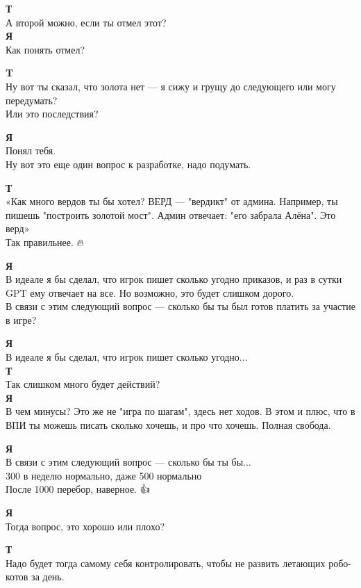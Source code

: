 \textbf{Т}\\
А второй можно, если ты отмел этот?\\

\textbf{Я}\\
Как понять отмел?

\textbf{T}\\
Ну вот ты сказал, что золота нет — я сижу и грущу до следующего или могу передумать?\\
Или это последствия?

\textbf{Я}\\
Понял тебя.\\
Ну вот это еще один вопрос к разработке, надо подумать.

\textbf{Т}\\
«Как много вердов ты бы хотел? ВЕРД — "вердикт" от админа. Например, ты пишешь "построить золотой мост". Админ отвечает: "его забрала Алёна". Это верд»\\
Так правильнее. 🔥🦔

\textbf{Я}\\
В идеале я бы сделал, что игрок пишет сколько угодно приказов, и раз в сутки GPT ему отвечает на все. Но возможно, это будет слишком дорого.\\
В связи с этим следующий вопрос — сколько бы ты был готов платить за участие в игре?

\textbf{Я}\\
В идеале я бы сделал, что игрок пишет сколько угодно...\\

\textbf{Т}\\
Так слишком много будет действий?\\

\textbf{Я}\\
В чем минусы? Это же не "игра по шагам", здесь нет ходов. В этом и плюс, что в ВПИ ты можешь писать сколько хочешь, и про что хочешь. Полная свобода.

\textbf{Я}\\
В связи с этим следующий вопрос — сколько бы ты бы...\\
300 в неделю нормально, даже 500 нормально\\
После 1000 перебор, наверное. 👍🎅

\textbf{Я}\\
Тогда вопрос, это хорошо или плохо?

\textbf{Т}\\
Надо будет тогда самому себя контролировать, чтобы не развить летающих робо-котов за день.

